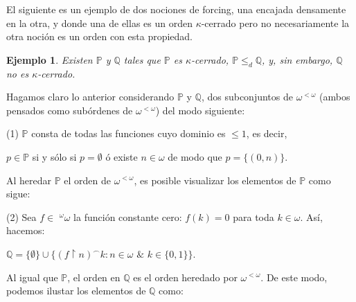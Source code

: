 \documentclass[11pt]{unam_tesis1}
\theoremstyle{MyThmStyle}
\theoremstyle{definition}
\theoremstyle{plain}
\newtheorem{example}{Ejemplo}[definition]
\theoremstyle{remark}
\def\rest{\mathop{\upharpoonright}\nolimits}
\let\leq\leqslant
\begin{document}
El siguiente es un ejemplo de dos nociones de forcing, una encajada densamente en la otra, y donde una de ellas es un orden $\kappa$-cerrado pero no necesariamente la otra noci\'on es un orden con esta propiedad.
\begin{example}
Existen $\mathbb P$ y $\mathbb Q$ tales que $\mathbb P$ es $\kappa$-cerrado, $\mathbb P\leq_d\mathbb Q$, y, sin embargo, $\mathbb Q$ no es $\kappa$-cerrado.
\end{example}
Hagamos claro lo anterior considerando $\mathbb P$ y $\mathbb Q$, dos subconjuntos de $\omega^{<\omega}$ (ambos pensados como sub\'ordenes de $\omega^{<\omega}$) del modo siguiente:

(1) $\mathbb P$ consta de todas las funciones cuyo dominio es $\leq 1$, es decir,

\begin{center}
$p\in \mathbb P$ si y s\'olo si $p=\emptyset$ \'o existe $n\in \omega$ de modo que $p=\{(0,n)\}$.
\end{center}
Al heredar $\mathbb P$ el orden de $\omega^{<\omega}$, es posible visualizar los elementos de $\mathbb P$ como sigue:
\begin{center}
\end{center}

(2) Sea $f\in$ $^{\omega}\omega$ la funci\'on constante cero: $f(k)=0$ para toda $k\in \omega$. As\'i, hacemos:

\begin{center}
$\mathbb Q=\{\emptyset\}\cup \{(f\rest n)^{\frown}k: n\in \omega$ $\&$ $k\in \{0,1\} \}$.
\end{center}

Al igual que $\mathbb P$, el orden en $\mathbb Q$ es el orden heredado por $\omega^{<\omega}$. De este modo, podemos ilustar los elementos de $\mathbb Q$ como:

\begin{center}
\end{center}
\end{document}
